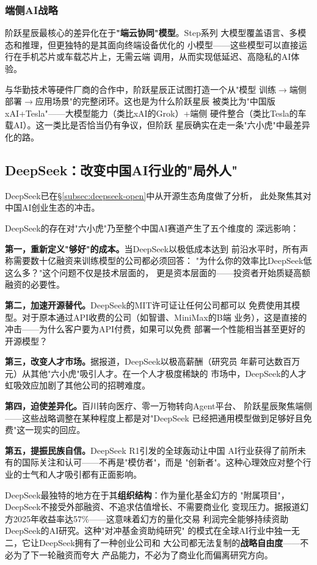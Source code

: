 \subsubsection{端侧AI战略}
阶跃星辰最核心的差异化在于\textbf{"端云协同"模型}。Step系列
大模型覆盖语言、多模态和推理，但更独特的是其面向终端设备优化的
小模型——这些模型可以直接运行在手机芯片或车载芯片上，无需云端
调用，从而实现低延迟、高隐私的AI体验。

与华勤技术等硬件厂商的合作中，阶跃星辰正试图打造一个从"模型
训练$\to$端侧部署$\to$应用场景"的完整闭环。这也是为什么阶跃星辰
被类比为"中国版xAI+Tesla"——大模型能力（类比xAI的Grok）+端侧
硬件整合（类比Tesla的车载AI）。这一类比是否恰当仍有争议，但阶跃
星辰确实在走一条"六小虎"中最差异化的路。

\subsection{DeepSeek：改变中国AI行业的"局外人"}
\label{subsec:deepseek-china}

DeepSeek已在§\ref{subsec:deepseek-open}中从开源生态角度做了分析，
此处聚焦其对中国AI创业生态的冲击。

DeepSeek的存在对"六小虎"乃至整个中国AI赛道产生了五个维度的
深远影响：

\textbf{第一，重新定义"够好"的成本。}当DeepSeek以极低成本达到
前沿水平时，所有声称需要数十亿融资来训练模型的公司都必须回答：
"为什么你的效率比DeepSeek低这么多？"这个问题不仅是技术层面的，
更是资本层面的——投资者开始质疑高额融资的必要性。

\textbf{第二，加速开源替代。}DeepSeek的MIT许可证让任何公司都可以
免费使用其模型。对于原本通过API收费的公司（如智谱、MiniMax的B端
业务），这是直接的冲击——为什么客户要为API付费，如果可以免费
部署一个性能相当甚至更好的开源模型？

\textbf{第三，改变人才市场。}据报道，DeepSeek以极高薪酬（研究员
年薪可达数百万元）从其他"六小虎"吸引人才。在一个人才极度稀缺的
市场中，DeepSeek的人才虹吸效应加剧了其他公司的招聘难度。

\textbf{第四，迫使差异化。}百川转向医疗、零一万物转向Agent平台、
阶跃星辰聚焦端侧——这些战略调整在某种程度上都是对"DeepSeek
已经把通用模型做到足够好且免费"这一现实的回应。

\textbf{第五，提振民族自信。}DeepSeek R1引发的全球轰动让中国
AI行业获得了前所未有的国际关注和认可——不再是"模仿者"，而是
"创新者"。这种心理效应对整个行业的士气和人才吸引都有正面影响。

DeepSeek最独特的地方在于其\textbf{组织结构}：作为量化基金幻方的
"附属项目"，DeepSeek不接受外部融资、不追求估值增长、不需要商业化
变现压力。据报道幻方2025年收益率达57\%——这意味着幻方的量化交易
利润完全能够持续资助DeepSeek的AI研究。这种"对冲基金资助纯研究"
的模式在全球AI行业中独一无二，它让DeepSeek拥有了一种创业公司和
大公司都无法复制的\textbf{战略自由度}——不必为了下一轮融资而夸大
产品能力，不必为了商业化而偏离研究方向。

